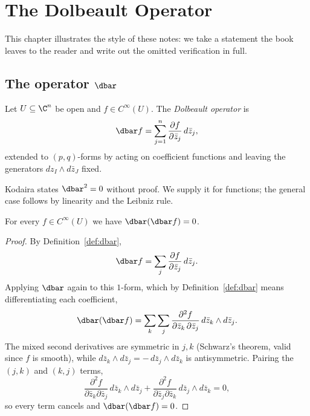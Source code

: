 \chapter{The Dolbeault Operator}

This chapter illustrates the style of these notes: we take a statement the
book leaves to the reader and write out the omitted verification in full.

\section{The operator \texorpdfstring{$\dbar$}{d-bar}}

\begin{definition}\label{def:dbar}
Let $U \subseteq \C^n$ be open and $f \in C^\infty(U)$. The \emph{Dolbeault
operator} is
\[
  \dbar f = \sum_{j=1}^{n} \frac{\partial f}{\partial \bar{z}_j}\, d\bar{z}_j ,
\]
extended to $(p,q)$-forms by acting on coefficient functions and leaving the
generators $dz_I \wedge d\bar{z}_J$ fixed.
\end{definition}

\begin{remark}
Kodaira states $\dbar^2 = 0$ without proof. We supply it for functions; the
general case follows by linearity and the Leibniz rule.
\end{remark}

\begin{proposition}\label{prop:dbar-squared}
For every $f \in C^\infty(U)$ we have $\dbar(\dbar f) = 0$.
\end{proposition}

\begin{proof}
By Definition~\ref{def:dbar},
\[
  \dbar f = \sum_{j} \frac{\partial f}{\partial \bar z_j}\, d\bar z_j .
\]
Applying $\dbar$ again to this $1$-form, which by Definition~\ref{def:dbar}
means differentiating each coefficient,
\[
  \dbar(\dbar f)
   = \sum_{k}\sum_{j}
     \frac{\partial^2 f}{\partial \bar z_k \, \partial \bar z_j}\,
     d\bar z_k \wedge d\bar z_j .
\]
The mixed second derivatives are symmetric in $j,k$ (Schwarz's theorem, valid
since $f$ is smooth), while $d\bar z_k \wedge d\bar z_j = -\, d\bar z_j \wedge
d\bar z_k$ is antisymmetric. Pairing the $(j,k)$ and $(k,j)$ terms,
\[
  \frac{\partial^2 f}{\partial \bar z_k \partial \bar z_j}\,
    d\bar z_k \wedge d\bar z_j
  + \frac{\partial^2 f}{\partial \bar z_j \partial \bar z_k}\,
    d\bar z_j \wedge d\bar z_k = 0 ,
\]
so every term cancels and $\dbar(\dbar f) = 0$.
\end{proof}
